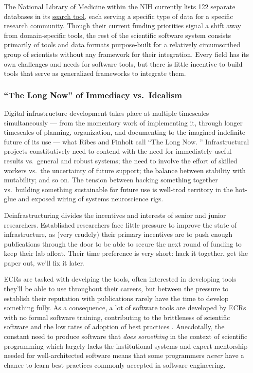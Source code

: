 \documentclass[10pt]{article}
\begin{document}
\begin{multicols}{2}
The National Library of Medicine within the NIH currently lists 122
separate databases in its
\href{https://eresources.nlm.nih.gov/nlm_eresources/}{search tool}, each
serving a specific type of data for a specific research community.
Though their current funding priorities signal a shift away from
domain-specific tools, the rest of the scientific software system
consists primarily of tools and data formats purpose-built for a
relatively circumscribed group of scientists without any framework for
their integration. Every field has its own challenges and needs for
software tools, but there is little incentive to build tools that serve
as generalized frameworks to integrate them.

\hypertarget{the-long-now-of-immediacy-vs.-idealism}{%
\subsubsection{``The Long Now'' of Immediacy
vs.~Idealism}\label{the-long-now-of-immediacy-vs.-idealism}}

Digital infrastructure development takes place at multiple timescales
simultaneously --- from the momentary work of implementing it, through
longer timescales of planning, organization, and documenting to the
imagined indefinite future of its use --- what Ribes and Finholt call
``The Long Now. \cite{ribesLongNowTechnology2009} ''
Infrastructural projects constitutively need to contend with the need
for immediately useful results vs.~general and robust systems; the need
to involve the effort of skilled workers vs.~the uncertainty of future
support; the balance between stability with mutability; and so on. The
tension between hacking something together vs.~building something
sustainable for future use is well-trod territory in the hot-glue and
exposed wiring of systems neuroscience rigs.

Deinfrastructuring divides the incentives and interests of senior and
junior researchers. Established researchers face little pressure to
improve the state of infrastructure, as (very crudely) their primary
incentives are to push enough publications through the door to be able
to secure the next round of funding to keep their lab afloat. Their time
preference is very short: hack it together, get the paper out, we'll fix
it later.

ECRs are tasked with develping the tools, often interested in developing
tools they'll be able to use throughout their careers, but between the
pressure to establish their reputation with publications rarely have the
time to develop something fully. As a consequence, a lot of software
tools are developed by ECRs with no formal software training,
contributing to the brittleness of scientific software and the low rates
of adoption of best practices \cite{altschulAnatomySuccessfulComputational2013} . Anecdotally, the
constant need to produce software that \emph{does something} in the
context of scientific programming which largely lacks the institutional
systems and expert mentorship needed for well-architected software means
that some programmers \emph{never} have a chance to learn best practices
commonly accepted in software engineering.


\end{multicols}
\end{document}
